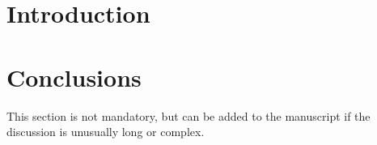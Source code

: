\documentclass[systems,article,submit,moreauthors,pdftex,10pt,a4paper]{mdpi}
\theoremstyle{mdpi}
\newcounter{ex}
\newcounter{re}
\theoremstyle{mdpidefinition}
\begin{document}




\section{Introduction}


\section{Conclusions}

This section is not mandatory, but can be added to the manuscript if the discussion is unusually long or complex.

\vspace{6pt} 






\end{document}
